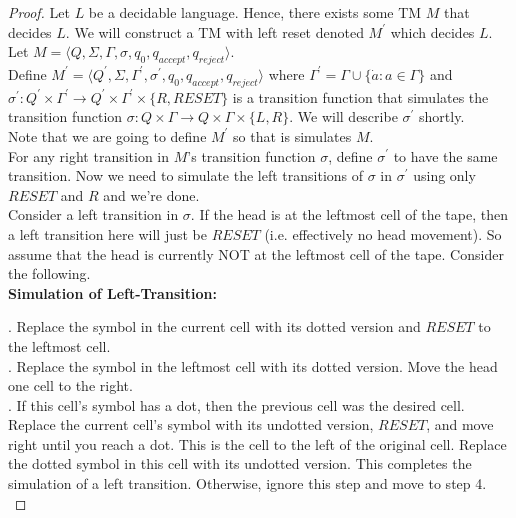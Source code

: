 \documentclass[12pt]{article}
\begin{document}
\begin{proof}
Let $L$ be a decidable language. Hence, there exists some TM $M$ that decides $L$. We will construct a TM with left reset denoted $M^\prime$ which decides $L$. \\

Let $M = \langle Q, \Sigma, \Gamma, \sigma, q_0, q_{accept}, q_{reject} \rangle$. \\

Define $M^\prime = \langle Q^\prime, \Sigma, \Gamma^\prime, \sigma^\prime, q_0, q_{accept}, q_{reject} \rangle$ where $\Gamma^\prime = \Gamma \cup \{\Dot{a} : a \in \Gamma\}$ and $\sigma^\prime: Q^\prime \times \Gamma^\prime \rightarrow Q^\prime \times \Gamma^\prime \times \{R, RESET\}$ is a transition function that simulates the transition function $\sigma: Q \times \Gamma \rightarrow Q \times \Gamma \times \{L,R\}$. We will describe $\sigma^\prime$ shortly. \\

Note that we are going to define $M^\prime$ so that is simulates $M$. \\

For any right transition in $M$'s transition function $\sigma$, define $\sigma^\prime$ to have the same transition. Now we need to simulate the left transitions of $\sigma$ in $\sigma^\prime$ using only $RESET$ and $R$ and we're done. \\

Consider a left transition in $\sigma$. If the head is at the leftmost cell of the tape, then a left transition here will just be $RESET$ (i.e. effectively no head movement). So assume that the head is currently NOT at the leftmost cell of the tape. Consider the following. \\

\textbf{Simulation of Left-Transition:} \\

\setlength\parindent{15pt}

. Replace the symbol in the current cell with its dotted version and $RESET$ to the leftmost cell. \\

. Replace the symbol in the leftmost cell with its dotted version. Move the head one cell to the right. \\

. If this cell's symbol has a dot, then the previous cell was the desired cell. Replace the current cell's symbol with its undotted version, $RESET$, and move right until you reach a dot. This is the cell to the left of the original cell. Replace the dotted symbol in this cell with its undotted version. This completes the simulation of a left transition. Otherwise, ignore this step and move to step 4.  \\


\end{proof}
\end{document}
